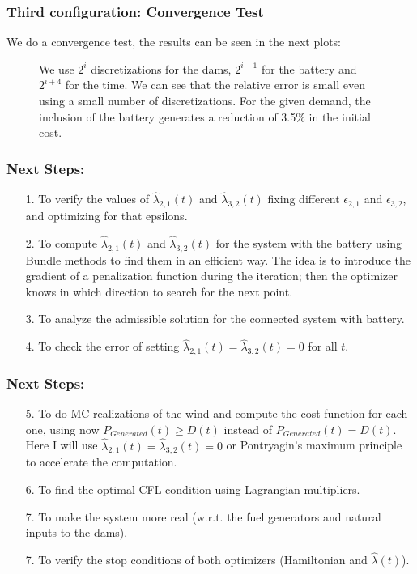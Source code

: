 \documentclass[aspectratio=169]{beamer}\usepackage[utf8]{inputenc}
\begin{document}
\begin{frame}\frametitle{Third configuration: Convergence Test}
We do a convergence test, the results can be seen in the next plots:
\begin{figure}[ht!]
\centering
{}
\caption{We use $2^{i}$ discretizations for the dams, $2^{i-1}$ for the battery and $2^{i+4}$ for the time. We can see that the relative error is small even using a small number of discretizations. For the given demand, the inclusion of the battery generates a reduction of 3.5\% in the initial cost.}
\end{figure}
\end{frame}

\begin{frame}\frametitle{Next Steps:}
\begin{enumerate}
\item[1.] To verify the values of $\hat{\lambda}_{2,1}(t)$ and $\hat{\lambda}_{3,2}(t)$ fixing different $\epsilon_{2,1}$ and $\epsilon_{3,2}$, and optimizing for that epsilons.
\item[2.] To compute $\hat{\lambda}_{2,1}(t)$ and $\hat{\lambda}_{3,2}(t)$ for the system with the battery using Bundle methods to find them in an efficient way. The idea is to introduce the gradient of a penalization function during the iteration; then the optimizer knows in which direction to search for the next point.
\item[3.] To analyze the admissible solution for the connected system with battery.
\item[4.] To check the error of setting $\hat{\lambda}_{2,1}(t)=\hat{\lambda}_{3,2}(t)=0$ for all $t$.
\end{enumerate}
\end{frame}

\begin{frame}\frametitle{Next Steps:}
\begin{enumerate}
\item[5.] To do MC realizations of the wind and compute the cost function for each one, using now $P_{Generated}(t)\geq D(t)$ instead of $P_{Generated}(t)=D(t)$. Here I will use $\hat{\lambda}_{2,1}(t)=\hat{\lambda}_{3,2}(t)=0$ or Pontryagin's maximum principle to accelerate the computation.
\item[6.] To find the optimal CFL condition using Lagrangian multipliers.
\item[7.] To make the system more real (w.r.t. the fuel generators and natural inputs to the dams).
\item[7.] To verify the stop conditions of both optimizers (Hamiltonian and $\hat{\lambda}(t)$).
\end{enumerate}
\end{frame}
\end{document}
